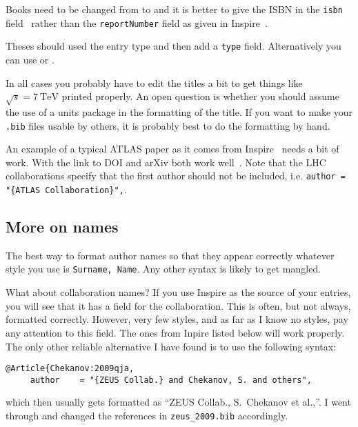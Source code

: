 Books need to be changed from  to
 and it is better to give the ISBN in the \texttt{isbn}
field~\cite{Halzen:1984mc-final} rather than the \texttt{reportNumber}
field as given in Inspire~\cite{Halzen:1984mc-inspire}.

Theses should used the  entry type and
then add a \texttt{type} field. Alternatively you can use
 or .

In all cases you probably have to edit the titles a bit to get
things like $\sqrt{s} = \SI{7}{\TeV}$ printed properly. An open
question is whether you should assume the use of a units package in
the formatting of the title. If you want to make your \texttt{.bib}
files usable by others, it is probably best to do the formatting by
hand.

An example of a typical ATLAS paper as it comes from
Inspire~\cite{Aad:2010ey-inspire} needs a bit of work.  With  the link to DOI and arXiv both work well~\cite{Aad:2010ey-final}.
Note that the LHC collaborations specify that the first author should not
be included, i.e. \verb|author = "{ATLAS Collaboration}",|.




\subsection{More on names}
\label{sec:ref:names}

The best way to format author names so that they appear correctly
whatever \BibTeX{} style you use is \texttt{Surname, Name}. Any other
syntax is likely to get mangled.

What about collaboration names? If you use Inspire as the source of
your \BibTeX{} entries, you will see that it has a field for the
collaboration. This is often, but not always, formatted
correctly. 
However, very few \BibTeX{} styles, and as far as I know no  styles, 
pay any attention to this field.
The ones from Inpire listed below will work properly. The
only other reliable alternative I have found is to use the following
syntax:
\begin{verbatim}
@Article{Chekanov:2009qja,
     author    = "{ZEUS Collab.} and Chekanov, S. and others",
\end{verbatim}
which then usually gets formatted as \enquote{ZEUS Collab., S.\ Chekanov et
al.,}.
I went through and changed the references in \texttt{zeus\_2009.bib}
accordingly.


